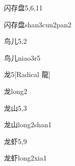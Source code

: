 \begin{entry}{闪存盘}{5,6,11}
  \begin{phonetics}{闪存盘}{shan3cun2pan2}
  \end{phonetics}
\end{entry}

\begin{entry}{鸟儿}{5,2}
  \begin{phonetics}{鸟儿}{niao3r5}
  \end{phonetics}
\end{entry}

\begin{entry}{龙}{5}[Radical 龍]
  \begin{phonetics}{龙}{long2}
  \end{phonetics}
\end{entry}

\begin{entry}{龙山}{5,3}
  \begin{phonetics}{龙山}{long2shan1}
  \end{phonetics}
\end{entry}

\begin{entry}{龙虾}{5,9}
  \begin{phonetics}{龙虾}{long2xia1}
  \end{phonetics}
\end{entry}



